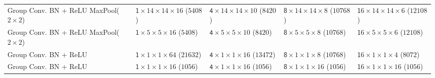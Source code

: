 \documentclass[twocolumn,final]{article}
\newcommand{\cellFormat}{\scriptsize \fontsize{7pt}{0pt}}
\newcommand{\shortTimes}{\! {\times} \!}
\newlength{\cellWidth}   \setlength{\cellWidth}{0.14\columnwidth}
\begin{document}
\begin{table}[ht!]
\begin{tabular}{p{} || p{\cellWidth}  p{\cellWidth} p{\cellWidth} p{\cellWidth}}
 \scriptsize \centering Group Conv. \newline BN + ReLU \newline MaxPool($2 \shortTimes 2$)
& \cellFormat $\mathsf 1 \shortTimes 14 \shortTimes 14 \shortTimes 16$ \newline ($5408$)
& \cellFormat $\mathsf 4 \shortTimes 14 \shortTimes 14 \shortTimes 10$ \newline ($8420$)
& \cellFormat $\mathsf 8 \shortTimes 14 \shortTimes 14 \shortTimes 8$  \newline ($10768$)
& \cellFormat $\mathsf 16 \shortTimes 14 \shortTimes 14 \shortTimes 6$ \newline ($12108$)
\\

 \scriptsize \centering Group Conv. \newline BN + ReLU \newline MaxPool($2 \shortTimes 2$)
& \cellFormat $\mathsf 1 \shortTimes 5 \shortTimes 5 \shortTimes 16$ \newline ($5408$)
& \cellFormat $\mathsf 4 \shortTimes 5 \shortTimes 5 \shortTimes 10$ \newline ($8420$)
& \cellFormat $\mathsf 8 \shortTimes 5 \shortTimes 5 \shortTimes 8$  \newline ($10768$)
& \cellFormat $\mathsf 16 \shortTimes 5 \shortTimes 5 \shortTimes 6$ \newline ($12108$)
\\

 \scriptsize \centering Group Conv. \newline BN + ReLU
& \cellFormat $\mathsf 1 \shortTimes 1 \shortTimes 1 \shortTimes 64$  \newline ($21632$)
& \cellFormat $\mathsf 4 \shortTimes 1 \shortTimes 1 \shortTimes 16$ \newline ($13472$)
& \cellFormat $\mathsf 8 \shortTimes 1 \shortTimes 1 \shortTimes 8$   \newline ($10768$)
& \cellFormat $\mathsf 16 \shortTimes 1 \shortTimes 1 \shortTimes 4$  \newline ($8072$)
\\

\scriptsize \centering Group Conv. \newline BN + ReLU
& \cellFormat $\mathsf 1 \shortTimes 1 \shortTimes 1 \shortTimes 16$  \newline ($1056$)
& \cellFormat $\mathsf 4 \shortTimes 1 \shortTimes 1 \shortTimes 16$  \newline ($1056$)
& \cellFormat $\mathsf 8 \shortTimes 1 \shortTimes 1 \shortTimes 16$  \newline ($1056$)
& \cellFormat $\mathsf 16 \shortTimes 1 \shortTimes 1 \shortTimes 16$ \newline ($1056$)
\\


\end{tabular}
\end{table}
\end{document}
